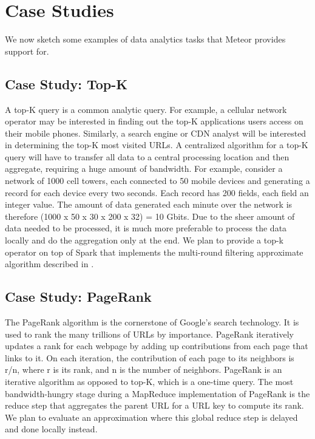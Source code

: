 \section{Case Studies}

We now sketch some examples of data analytics tasks that Meteor provides support for. 

\subsection{Case Study: Top-K}

A top-K query is a common analytic query. For example, a cellular network operator may be interested in finding out the top-K applications users access on their mobile phones. Similarly, a search engine or CDN analyst will be interested in determining the top-K most visited URLs. 
A centralized algorithm for a top-K query will have to transfer all data to a central processing location and then aggregate, requiring a huge amount of bandwidth. For example, consider a network of 1000 cell towers, each connected to 50 mobile devices and generating a record for each device every two seconds. Each record has 200 fields, each field an integer value. The amount of data generated each minute over the network is therefore (1000 x 50 x 30 x 200 x 32) = 10 Gbits. Due to the sheer amount of data needed to be processed, it is much more preferable to process the data locally and do the aggregation only at the end. We plan to provide a top-k operator on top of Spark that implements the multi-round filtering approximate algorithm described in \cite{3}.

\subsection{Case Study: PageRank}

The PageRank algorithm is the cornerstone of Google’s search technology. It is used to rank the many trillions of URLs by importance. PageRank iteratively updates a rank for each webpage by adding up contributions from each page that links to it. On each iteration, the contribution of each page to its neighbors is r/n, where r is its rank, and n is the number of neighbors.
PageRank is an iterative algorithm as opposed to top-K, which is a one-time query. The most bandwidth-hungry stage during a MapReduce implementation of PageRank is the reduce step that aggregates the parent URL for a URL key to compute its rank. We plan to evaluate an approximation where this global reduce step is delayed and done locally instead. 

